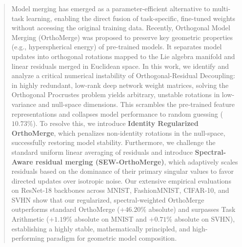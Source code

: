 \documentclass{article}
\theoremstyle{plain}
\theoremstyle{definition}
\theoremstyle{remark}
\begin{document}

\printAffiliationsAndNotice{}

\begin{abstract}
  Model merging has emerged as a parameter-efficient alternative to multi-task learning, enabling the direct fusion of task-specific, fine-tuned weights without accessing the original training data. Recently, Orthogonal Model Merging (OrthoMerge) was proposed to preserve key geometric properties (e.g., hyperspherical energy) of pre-trained models. It separates model updates into orthogonal rotations mapped to the Lie algebra manifold and linear residuals merged in Euclidean space. In this work, we identify and analyze a critical numerical instability of Orthogonal-Residual Decoupling: in highly redundant, low-rank deep network weight matrices, solving the Orthogonal Procrustes problem yields arbitrary, unstable rotations in low-variance and null-space dimensions. This scrambles the pre-trained feature representations and collapses model performance to random guessing ($10.73\%$). To resolve this, we introduce \textbf{Identity Regularized OrthoMerge}, which penalizes non-identity rotations in the null-space, successfully restoring model stability. Furthermore, we challenge the standard uniform linear averaging of residuals and introduce \textbf{Spectral-Aware residual merging (SEW-OrthoMerge)}, which adaptively scales residuals based on the dominance of their primary singular values to favor directed updates over isotropic noise. Our extensive empirical evaluations on ResNet-18 backbones across MNIST, FashionMNIST, CIFAR-10, and SVHN show that our regularized, spectral-weighted OrthoMerge outperforms standard OrthoMerge ($+46.20\%$ absolute) and surpasses Task Arithmetic ($+1.19\%$ absolute on MNIST and $+0.71\%$ absolute on SVHN), establishing a highly stable, mathematically principled, and high-performing paradigm for geometric model composition.
\end{abstract}
\end{document}
